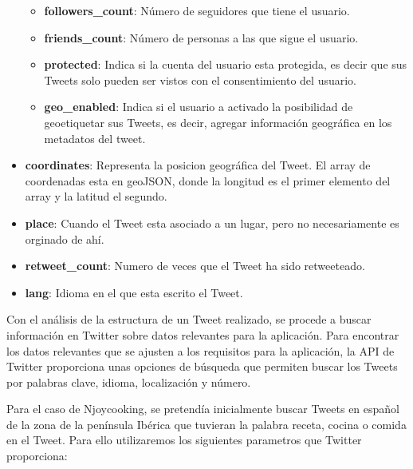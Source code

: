 \begin{itemize}
\begin{itemize}
\item \textbf{followers\_count}: Número de seguidores que tiene el usuario.

\item \textbf{friends\_count}: Número de personas a las que sigue el usuario.

\item \textbf{protected}: Indica si la cuenta del usuario esta protegida, es decir que sus Tweets solo pueden ser vistos con el consentimiento del usuario.

\item \textbf{geo\_enabled}: Indica si el usuario a activado la posibilidad de geoetiquetar sus Tweets, es decir, agregar información geográfica en los metadatos del tweet.


\end{itemize}

\item \textbf{coordinates}: Representa la posicion geográfica del Tweet. El array de coordenadas esta en geoJSON, donde la longitud es el primer elemento del array y la latitud el segundo.

\item \textbf{place}: Cuando el Tweet esta asociado a un lugar, pero no necesariamente es orginado de ahí.

\item \textbf{retweet\_count}: Numero de veces que el Tweet ha sido retweeteado.

\item \textbf{lang}: Idioma en el que esta escrito el Tweet. 

\end{itemize}

\vspace{5 mm}

Con el análisis de la estructura de un Tweet realizado, se procede a buscar información en Twitter sobre datos relevantes para la aplicación. Para encontrar los datos relevantes que se ajusten a los requisitos para la aplicación, la API de Twitter proporciona unas opciones de búsqueda que permiten buscar los Tweets por palabras clave, idioma, localización y número.

\vspace{5 mm}

Para el caso de Njoycooking, se pretendía inicialmente buscar Tweets en español de la zona de la península Ibérica que tuvieran la palabra receta, cocina o comida en el Tweet. Para ello utilizaremos los siguientes parametros que Twitter proporciona:

